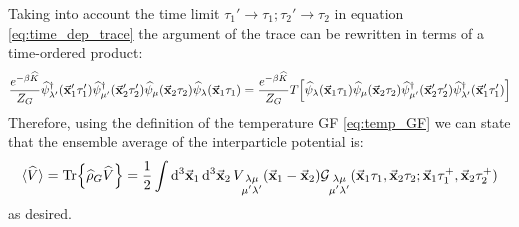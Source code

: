\documentclass[a4paper]{article}
\newcommand{\meanv}[1]{\langle #1 \rangle}
\renewcommand{\hat}{\widehat}
\begin{document}
Taking into account the time limit $\tau_1'\rightarrow\tau_1; \tau_2'\rightarrow\tau_2$ in equation \eqref{eq:time_dep_trace} the argument of the trace can be rewritten in terms of a time-ordered product:
\begin{equation}
\frac{e^{-\beta\hat{K}}}{Z_G}
\hat{\psi}_{\lambda'}^\dag(\va{x}_1'\tau_1') \hat{\psi}_{\mu'}^\dag(\va{x}_2'\tau_2')
\hat{\psi}_\mu(\va{x}_2\tau_2) \hat{\psi}_\lambda(\va{x}_1\tau_1)
 = \frac{e^{-\beta\hat{K}}}{Z_G} T\bqty{
\hat{\psi}_\lambda(\va{x}_1\tau_1) \hat{\psi}_\mu(\va{x}_2\tau_2) 
\hat{\psi}_{\mu'}^\dag(\va{x}_2'\tau_2') \hat{\psi}_{\lambda'}^\dag(\va{x}_1'\tau_1')
 }
\end{equation}
Therefore, using the definition of the temperature GF \eqref{eq:temp_GF} we can state that the ensemble average of the interparticle potential is:
\begin{equation}
\meanv{\hat{V}} = \Tr{\hat{\rho}_G\hat{V}} = \frac{1}{2}\int\dd[3]{\va{x}_1}\dd[3]{\va{x}_2} V_{\substack{\lambda\mu\\\mu'\lambda'}}(\va{x}_1 - \va{x}_2)
\mathcal{G}_{\substack{\lambda\mu\\\mu'\lambda'}}(\va{x}_1\tau_1,\va{x}_2\tau_2;\va{x}_1\tau_1^+,\va{x}_2\tau_2^+)
\end{equation}
as desired.
\end{document}
